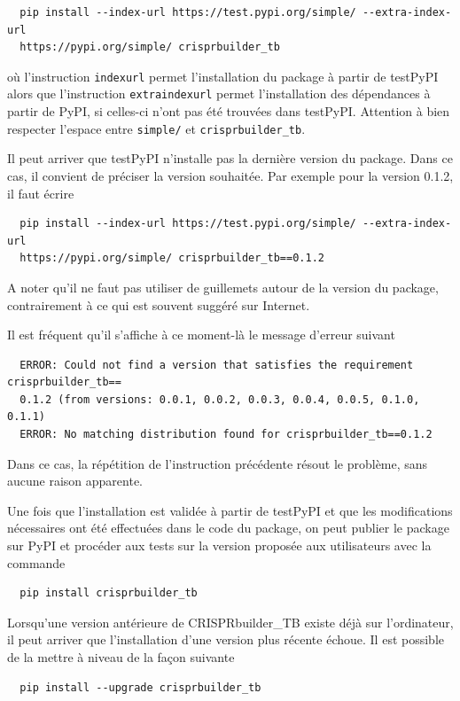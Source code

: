 \documentclass[twoside,a4paper,11pt,frenchb,openany]{report}
\begin{document}
\begin{verbatim}  pip install --index-url https://test.pypi.org/simple/ --extra-index-url 
  https://pypi.org/simple/ crisprbuilder_tb\end{verbatim} 

où l'instruction \texttt{\textemdash \textemdash index\textemdash url} permet l'installation du package à partir de testPyPI alors que l'instruction \texttt{\textemdash \textemdash extra\textemdash index\textemdash url} permet l'installation des dépendances à partir de PyPI, si celles-ci n'ont pas été trouvées dans testPyPI. Attention à bien respecter l'espace entre \texttt{simple/} et \texttt{crisprbuilder\_tb}.

Il peut arriver que testPyPI n'installe pas la dernière version du package. Dans ce cas, il convient de préciser la version souhaitée. Par exemple pour la version 0.1.2, il faut écrire

\begin{verbatim}  pip install --index-url https://test.pypi.org/simple/ --extra-index-url 
  https://pypi.org/simple/ crisprbuilder_tb==0.1.2\end{verbatim} 

A noter qu'il ne faut pas utiliser de guillemets autour de la version du package, contrairement à ce qui est souvent suggéré sur Internet.

Il est fréquent qu'il s'affiche à ce moment-là le message d'erreur suivant

\begin{verbatim}  ERROR: Could not find a version that satisfies the requirement crisprbuilder_tb==
  0.1.2 (from versions: 0.0.1, 0.0.2, 0.0.3, 0.0.4, 0.0.5, 0.1.0, 0.1.1)
  ERROR: No matching distribution found for crisprbuilder_tb==0.1.2\end{verbatim}

Dans ce cas, la répétition de l'instruction précédente résout le problème, sans aucune raison apparente.

Une fois que l'installation est validée à partir de testPyPI et que les modifications nécessaires ont été effectuées dans le code du package, on peut publier le package sur PyPI et procéder aux tests sur la version proposée aux utilisateurs avec la commande

\begin{verbatim}
  pip install crisprbuilder_tb
\end{verbatim}

Lorsqu'une version antérieure de CRISPRbuilder\_TB existe déjà sur l'ordinateur, il peut arriver que l'installation d'une version plus récente échoue. Il est possible de la mettre à niveau de la façon suivante
\begin{verbatim}
  pip install --upgrade crisprbuilder_tb
\end{verbatim}
\end{document}
